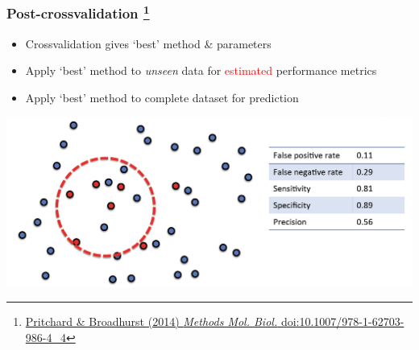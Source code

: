 \begin{frame}
  \frametitle{Post-crossvalidation
  \footnote{\tiny{\href{http://dx.doi.org/10.1007/978-1-62703-986-4_4}{Pritchard \& Broadhurst (2014) \textit{Methods Mol. Biol.} doi:10.1007/978-1-62703-986-4\_4}}}
}
  \begin{itemize}
    \item \textcolor{hutton_green}{Crossvalidation gives `best' method \& parameters}
    \item Apply `best' method to \textit{unseen} data for \textcolor{red}{estimated} performance metrics
    \item \textcolor{hutton_purple}{Apply `best' method to complete dataset for prediction}
  \end{itemize}
  \includegraphics[width=1\textwidth]{images/finding_effectors12}    
\end{frame}

